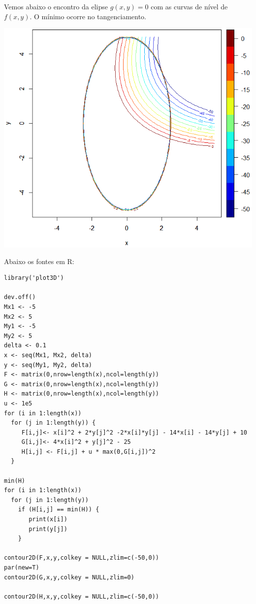 \documentclass{rbfin}
\begin{document}
\newpage

Vemos abaixo o encontro da elipse $g(x,y) = 0$ com as curvas de nível de $f(x,y)$. O mínimo ocorre no tangenciamento.

\begin{center}
\includegraphics[scale=0.75]{FG}
\end{center}

Abaixo os fontes em R:

\singlespacing

\begin{verbatim}
library('plot3D')

dev.off()
Mx1 <- -5
Mx2 <- 5
My1 <- -5
My2 <- 5
delta <- 0.1
x <- seq(Mx1, Mx2, delta)
y <- seq(My1, My2, delta)
F <- matrix(0,nrow=length(x),ncol=length(y))
G <- matrix(0,nrow=length(x),ncol=length(y))
H <- matrix(0,nrow=length(x),ncol=length(y))
u <- 1e5
for (i in 1:length(x))
  for (j in 1:length(y)) {
     F[i,j]<- x[i]^2 + 2*y[j]^2 -2*x[i]*y[j] - 14*x[i] - 14*y[j] + 10
     G[i,j]<- 4*x[i]^2 + y[j]^2 - 25
     H[i,j] <- F[i,j] + u * max(0,G[i,j])^2
  }

min(H)
for (i in 1:length(x))
  for (j in 1:length(y))
    if (H[i,j] == min(H)) {
       print(x[i])
       print(y[j])
    }

contour2D(F,x,y,colkey = NULL,zlim=c(-50,0)) 
par(new=T)
contour2D(G,x,y,colkey = NULL,zlim=0) 

contour2D(H,x,y,colkey = NULL,zlim=c(-50,0)) 
\end{verbatim}
\end{document}
